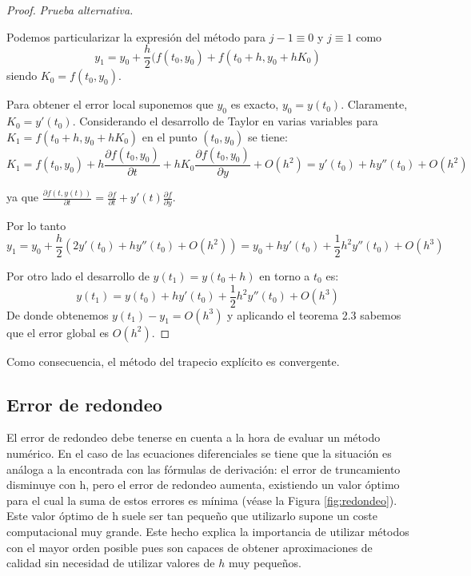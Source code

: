 \documentclass{article}
\theoremstyle{theorem-style}  %
\theoremstyle{definition-style}
\theoremstyle{example-style}
\begin{document}
		\begin{proof} \textit{Prueba alternativa.}

			Podemos particularizar la expresión del método para $j-1 \equiv 0$ y $j \equiv 1$ como
			$$y_1=y_0+\frac{h}{2}(f(t_0,y_0)+f(t_0+h,y_0+h K_0)$$ siendo $K_0=f(t_0,y_0)$.

			Para obtener el error local suponemos que $y_0$ es exacto, $y_0=y(t_0)$. Claramente, $K_0 = y'(t_0)$. Considerando el desarrollo de Taylor en varias variables para $K_1=f(t_0+h,y_0+h K_0)$ en el punto $(t_0,y_0)$ se tiene:
			$$K_1 = f(t_0,y_0) + h \frac{\partial f(t_0,y_0)}{\partial t}+h K_0\frac{\partial f(t_0,y_0)}{\partial y}+O(h^{2})=y'(t_0)+hy''(t_0)+O(h^{2})$$

			ya que $\frac{\partial f(t,y(t))}{\partial t} = \frac{\partial f}{\partial t} + y'(t)\frac{\partial f}{\partial y}$.

			Por lo tanto $$y_1=y_0+\frac{h}{2}(2y'(t_0)+hy''(t_0)+O(h^2))=y_0+hy'(t_0)+\frac{1}{2}h^{2}y''(t_0)+O(h^3)$$

			Por otro lado el desarrollo de $y(t_1)=y(t_0 + h)$ en torno a $t_0$ es:
			$$y(t_1)=y(t_0)+hy'(t_0)+\frac{1}{2}h^{2}y''(t_0)+O(h^{3})$$
			De donde obtenemos $y(t_1)-y_1=O(h^{3})$ y aplicando el teorema 2.3 sabemos que el error global es $O(h^{2})$.
		\end{proof}

        Como consecuencia, el método del trapecio explícito es convergente.

    \subsection{Error de redondeo} \label{sec:trapecio-explicito:redondeo}

		El error de redondeo debe tenerse en cuenta a la hora de evaluar un método numérico. En el caso de las ecuaciones diferenciales se tiene que la situación es análoga a la encontrada con las fórmulas de derivación: el error de truncamiento disminuye con h, pero el error de redondeo aumenta, existiendo un valor óptimo para el cual la suma de estos errores es mínima (véase la Figura \ref{fig:redondeo}). Este valor óptimo de h suele ser tan pequeño que utilizarlo supone un coste computacional muy grande. Este hecho explica la importancia de utilizar métodos con el mayor orden posible pues son capaces de obtener aproximaciones de calidad sin necesidad de utilizar valores de $h$ muy pequeños. \cite{Vazquez}
\end{document}
